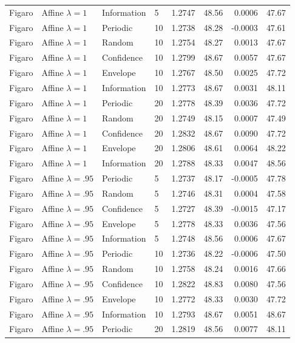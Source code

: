 \begin{longtable}{llllrrrr}
Figaro & Affine $\lambda=1$ & Information & 5 & 1.2747 & 48.56 & 0.0006 & 47.67 \\
Figaro & Affine $\lambda=1$ & Periodic & 10 & 1.2738 & 48.28 & -0.0003 & 47.61 \\
Figaro & Affine $\lambda=1$ & Random & 10 & 1.2754 & 48.27 & 0.0013 & 47.67 \\
Figaro & Affine $\lambda=1$ & Confidence & 10 & 1.2799 & 48.67 & 0.0057 & 47.67 \\
Figaro & Affine $\lambda=1$ & Envelope & 10 & 1.2767 & 48.50 & 0.0025 & 47.72 \\
Figaro & Affine $\lambda=1$ & Information & 10 & 1.2773 & 48.67 & 0.0031 & 48.11 \\
Figaro & Affine $\lambda=1$ & Periodic & 20 & 1.2778 & 48.39 & 0.0036 & 47.72 \\
Figaro & Affine $\lambda=1$ & Random & 20 & 1.2749 & 48.15 & 0.0007 & 47.49 \\
Figaro & Affine $\lambda=1$ & Confidence & 20 & 1.2832 & 48.67 & 0.0090 & 47.72 \\
Figaro & Affine $\lambda=1$ & Envelope & 20 & 1.2806 & 48.61 & 0.0064 & 48.22 \\
Figaro & Affine $\lambda=1$ & Information & 20 & 1.2788 & 48.33 & 0.0047 & 48.56 \\
Figaro & Affine $\lambda=.95$ & Periodic & 5 & 1.2737 & 48.17 & -0.0005 & 47.78 \\
Figaro & Affine $\lambda=.95$ & Random & 5 & 1.2746 & 48.31 & 0.0004 & 47.58 \\
Figaro & Affine $\lambda=.95$ & Confidence & 5 & 1.2727 & 48.39 & -0.0015 & 47.17 \\
Figaro & Affine $\lambda=.95$ & Envelope & 5 & 1.2778 & 48.33 & 0.0036 & 47.56 \\
Figaro & Affine $\lambda=.95$ & Information & 5 & 1.2748 & 48.56 & 0.0006 & 47.67 \\
Figaro & Affine $\lambda=.95$ & Periodic & 10 & 1.2736 & 48.22 & -0.0006 & 47.50 \\
Figaro & Affine $\lambda=.95$ & Random & 10 & 1.2758 & 48.24 & 0.0016 & 47.66 \\
Figaro & Affine $\lambda=.95$ & Confidence & 10 & 1.2822 & 48.83 & 0.0080 & 47.56 \\
Figaro & Affine $\lambda=.95$ & Envelope & 10 & 1.2772 & 48.33 & 0.0030 & 47.72 \\
Figaro & Affine $\lambda=.95$ & Information & 10 & 1.2793 & 48.67 & 0.0051 & 48.67 \\
Figaro & Affine $\lambda=.95$ & Periodic & 20 & 1.2819 & 48.56 & 0.0077 & 48.11 \\

\end{longtable}
